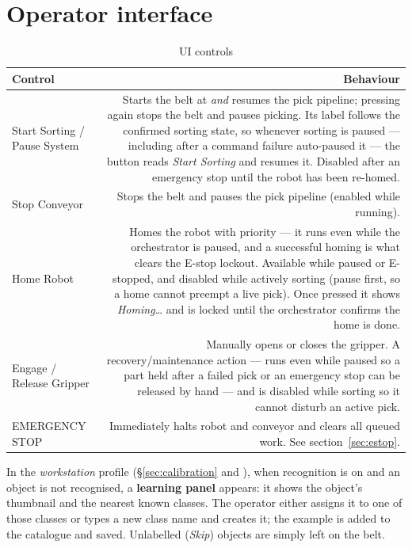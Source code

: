 \section{Operator interface}
%
\begin{table}[h]
  \centering
  \begin{tabularx}{\textwidth}{lD}
    \toprule
    \textbf{Control} & \textbf{Behaviour} \\
    \midrule
    Start Sorting / Pause System & Starts the belt at 
      \emph{and} resumes the pick pipeline; pressing again stops the belt
      and pauses picking. Its label follows the confirmed sorting state, so
      whenever sorting is paused --- including after a command failure
      auto-paused it --- the button reads \emph{Start Sorting} and resumes
      it. Disabled after an emergency stop until the robot has been
      re-homed. \\
    Stop Conveyor & Stops the belt and pauses the pick pipeline (enabled
      while running). \\
    Home Robot & Homes the robot with priority — it runs even while the
      orchestrator is paused, and a successful homing is what clears the
      E-stop lockout. Available while paused or E-stopped, and disabled while
      actively sorting (pause first, so a home cannot preempt a live pick).
      Once pressed it shows \emph{Homing\ldots} and is locked until the
      orchestrator confirms the home is done. \\
    Engage / Release Gripper & Manually opens or closes the gripper. A
      recovery/maintenance action --- runs even while paused so a part held
      after a failed pick or an emergency stop can be released by hand ---
      and is disabled while sorting so it cannot disturb an active pick. \\
    EMERGENCY STOP & Immediately halts robot and conveyor and clears all
      queued work. See section~\ref{sec:estop}. \\
    \bottomrule
  \end{tabularx}
  \caption{UI controls}
\end{table}

In the \emph{workstation} profile (\S\ref{sec:calibration} and
), when recognition is on and an object is not recognised, a
\textbf{learning panel} appears: it shows the object's thumbnail and the
nearest known classes. The operator either assigns it to one of those classes
or types a new class name and creates it; the example is added to the
catalogue and saved. Unlabelled (\emph{Skip}) objects are simply left on the
belt.

